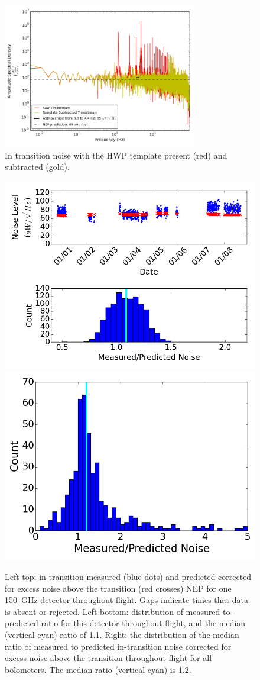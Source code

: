 \begin{figure}[ht!]
\begin{center}
\includegraphics[height=2.5in]{figures/board68_wire2_ch04_1356979731s_transition.png}
\caption{In transition noise with the \ac{HWP} template present (red) and subtracted (gold).
\label{fig:one_bolo_overbias_noise} }
\end{center}
\end{figure}


\begin{figure}[ht!]
\begin{center}
\includegraphics[width=0.48\columnwidth]{figures/board68_wire2_ch06_transition.png}
\includegraphics[width=0.48\columnwidth]{figures/in_transition_histogram.png}
\caption{Left top: in-transition measured (blue dots) and predicted corrected for excess noise above the transition (red crosses) \ac{NEP} for one 150~GHz detector 
throughout flight. Gaps indicate times that data is absent or rejected. 
Left bottom: distribution 
of measured-to-predicted ratio for this detector throughout flight, and the median (vertical cyan) ratio of 1.1.
Right: the distribution of the median ratio of measured to predicted in-transition noise corrected for excess noise above the transition throughout flight for all bolometers.
The median ratio (vertical cyan) is 1.2. 
\label{fig:in_transition_noise} }
\end{center}
\end{figure}



